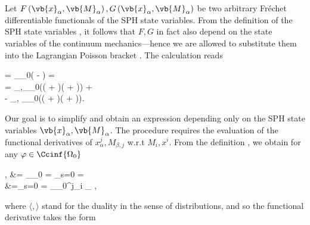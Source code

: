 \documentclass[../main.tex]{subfiles}
\begin{document}
Let $F\left(\vb{x}_{\alpha}, \vb{M}_{\alpha}\right), G\left(\vb{x}_{\alpha}, \vb{M}_{\alpha}\right)$ be two arbitrary Fréchet differentiable functionals of the SPH state variables. From the definition of the SPH state variables ,  it follows that $F, G$ in fact also depend on the state variables of the continuum mechanics---hence we are allowed to substitute them into the Lagrangian Poisson bracket . The calculation reads

\begin{equations}[lines,!,numberline=all]
	\label{eq:TERM}
	 = \bigint_{\Omega_0}\left( -  \right) = \\ = \sum_{\alpha,\beta}\bigint_{\Omega_0}\left(\left(  + \right)\left( + \right)\right) + \\ - \sum_{\alpha,\beta} \bigint_{\Omega_0}\left(\left(  +  \right)\left(  +  \right)\right).
\end{equations}

Our goal is to simplify  and obtain an expression depending only on the SPH state variables $\vb{x}_{\alpha}, \vb{M}_{\alpha}$. The procedure requires the evaluation of the functional derivatives of $x^j_{\alpha}, M_{\beta,j}$ w.r.t $M_i, x^i$. From the definition , we obtain for any $\varphi \in \Ccinf{\Omega_0}$

\begin{equations}[columns,*]
	\left\langle {}, \varphi \right\rangle	&= \bigint_{\Omega_0}  \varphi {} = _{s=0} =\\ 
											&=_{s=0} = \int_{\Omega_0}\delta^j_i \chi_{\alpha} \varphi{}, 
\end{equations}

where $\langle,\rangle$ stand for the duality in the sense of distributions, and so the functional derivative takes the form
\end{document}
